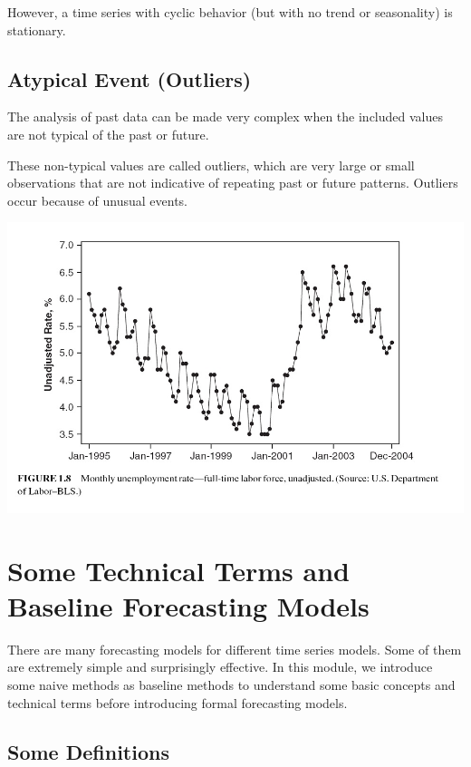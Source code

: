 \documentclass[
]{book}
\begin{document}
However, a time series with cyclic behavior (but with no trend or seasonality) is stationary.

\hypertarget{atypical-event-outliers}{%
\subsection{Atypical Event (Outliers)}\label{atypical-event-outliers}}

The analysis of past data can be made very complex when the included values are not typical of the past or future.

These non-typical values are called outliers, which are very large or small observations that are not indicative of repeating past or future patterns. Outliers occur because of unusual events.

\begin{center}\includegraphics[width=0.8\linewidth]{img11/w11-Figure08} \end{center}

\hypertarget{some-technical-terms-and-baseline-forecasting-models}{%
\section{Some Technical Terms and Baseline Forecasting Models}\label{some-technical-terms-and-baseline-forecasting-models}}

There are many forecasting models for different time series models. Some of them are extremely simple and surprisingly effective. In this module, we introduce some naive methods as baseline methods to understand some basic concepts and technical terms before introducing formal forecasting models.

\hypertarget{some-definitions}{%
\subsection{Some Definitions}\label{some-definitions}}
\end{document}
